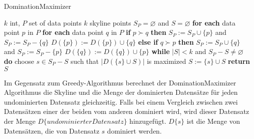 \begin{algorithm}[H]
\caption{DominationMaximizer}\label{algo:domMaximizer}
\begin{algorithmic}[1]
\INPUTBF $k$ int, $P$ set of data points
\OUTPUTBF $k$ skyline points
\State $S_P = \varnothing$ and $S = \varnothing$
\State \textbf{for each} data point $p$ in $P$ 
\State \hspace{\algorithmicindent} \textbf{for each} data point $q$ in $P$
\State \hspace{\algorithmicindent} \hspace{\algorithmicindent} \textbf{if} $p \succ q$ \textbf{then} 
\State \hspace{\algorithmicindent} \hspace{\algorithmicindent} \hspace{\algorithmicindent} $S_P:= S_P \cup \{p\}$ and $S_P:= S_P-\{q\}$
\State \hspace{\algorithmicindent} \hspace{\algorithmicindent} \hspace{\algorithmicindent} $D(\{p\}):=D(\{p\}) \cup \{q\}$  
\State \hspace{\algorithmicindent} \hspace{\algorithmicindent} \textbf{else if} $q \succ p$ \textbf{then} 
\State \hspace{\algorithmicindent} \hspace{\algorithmicindent} \hspace{\algorithmicindent} $S_P:= S_P \cup \{q\}$ and $S_P:= S_P-\{p\}$  
\State \hspace{\algorithmicindent} \hspace{\algorithmicindent} \hspace{\algorithmicindent} $D(\{q\}):=D(\{q\}) \cup \{p\}$  
\State \textbf{while} $|S|<k$ and $S_P-S \neq \varnothing$ \textbf{do}
\State \hspace{\algorithmicindent} choose $s \in {S_P-S}$ such that $|D(\{s\} \cup S)|$ is maximized
\State \hspace{\algorithmicindent} $S:=\{s\} \cup S$
\State \textbf{return} $S$
\end{algorithmic}
\end{algorithm}

Im Gegensatz zum Greedy-Algorithmus berechnet der DominationMaximizer Algorithmus die Skyline und die Menge der dominierten Datensätze für jeden undominierten Datensatz gleichzeitig. Falls bei einem Vergleich zwischen zwei Datensätzen einer der beiden vom anderen dominiert wird, wird dieser Datensatz der Menge $D\{undominierter Datensatz\}$ hinzugefügt. $D\{s\}$ ist die Menge von Datensätzen, die von Datensatz $s$ dominiert werden. 

